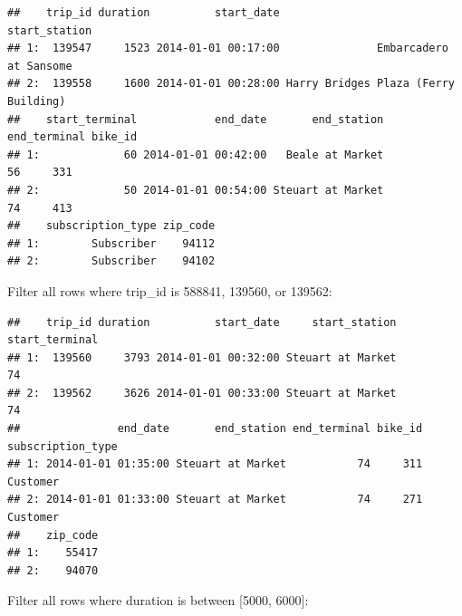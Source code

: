 \documentclass[]{book}
\newenvironment{Shaded}{\begin{snugshade}}{\end{snugshade}}
\newcommand{\DecValTok}[1]{\textcolor[rgb]{0.00,0.00,0.81}{#1}}
\newcommand{\KeywordTok}[1]{\textcolor[rgb]{0.13,0.29,0.53}{\textbf{#1}}}
\newcommand{\NormalTok}[1]{#1}
\newcommand{\OperatorTok}[1]{\textcolor[rgb]{0.81,0.36,0.00}{\textbf{#1}}}
\newcommand{\StringTok}[1]{\textcolor[rgb]{0.31,0.60,0.02}{#1}}
\begin{document}
\begin{verbatim}
##    trip_id duration          start_date                        start_station
## 1:  139547     1523 2014-01-01 00:17:00               Embarcadero at Sansome
## 2:  139558     1600 2014-01-01 00:28:00 Harry Bridges Plaza (Ferry Building)
##    start_terminal            end_date       end_station end_terminal bike_id
## 1:             60 2014-01-01 00:42:00   Beale at Market           56     331
## 2:             50 2014-01-01 00:54:00 Steuart at Market           74     413
##    subscription_type zip_code
## 1:        Subscriber    94112
## 2:        Subscriber    94102
\end{verbatim}

Filter all rows where trip\_id is 588841, 139560, or 139562:

\begin{Shaded}
\end{Shaded}

\begin{verbatim}
##    trip_id duration          start_date     start_station start_terminal
## 1:  139560     3793 2014-01-01 00:32:00 Steuart at Market             74
## 2:  139562     3626 2014-01-01 00:33:00 Steuart at Market             74
##               end_date       end_station end_terminal bike_id subscription_type
## 1: 2014-01-01 01:35:00 Steuart at Market           74     311          Customer
## 2: 2014-01-01 01:33:00 Steuart at Market           74     271          Customer
##    zip_code
## 1:    55417
## 2:    94070
\end{verbatim}

Filter all rows where duration is between {[}5000, 6000{]}:

\begin{Shaded}
\end{Shaded}
\end{document}

